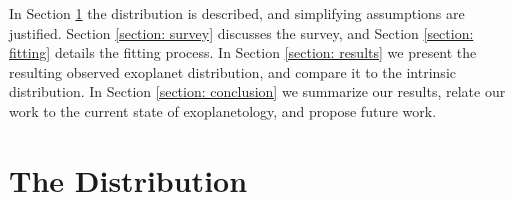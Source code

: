 \documentclass[12pt,manuscript]{aastex}
\begin{document}
In Section \ref{section: distribution} the  distribution is described, and simplifying assumptions are justified.
Section \ref{section: survey} discusses the survey, and
Section \ref{section: fitting} details the fitting process.
In Section \ref{section: results} we present the resulting observed exoplanet distribution, and compare it to the intrinsic distribution.
In Section \ref{section: conclusion} we summarize our results, relate our work to the current state of exoplanetology, and propose future work.


\section{The Distribution}
\label{section: distribution}
\end{document}
